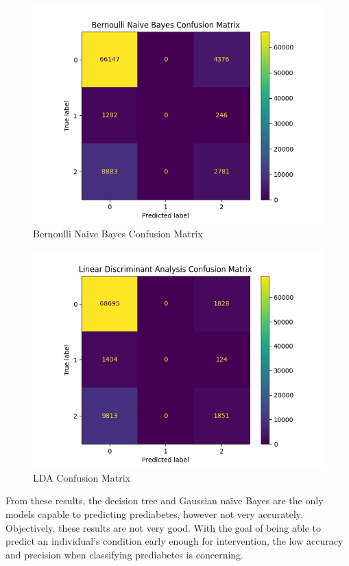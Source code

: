 \documentclass[journal]{IEEEtran}
\begin{document}
\begin{figure}[h!]
    \includegraphics[scale=0.5]{Bernoulli Naive Bayes_cm.png}
    \centering
    \caption{Bernoulli Naive Bayes Confusion Matrix}
    \label{fig:bernnb}
    \end{figure}

\begin{figure}[h!]
    \includegraphics[scale=0.5]{Linear Discriminant Analysis_cm.png}
    \centering
    \caption{LDA Confusion Matrix}
    \label{fig:lda}
    \end{figure}


From these results, the decision tree and Gaussian naïve Bayes are the only models capable to predicting prediabetes, however not very accurately. Objectively, these results are not very good. With the goal of being able to predict an individual's condition early enough for intervention, the low accuracy and precision when classifying prediabetes is concerning.
\end{document}
